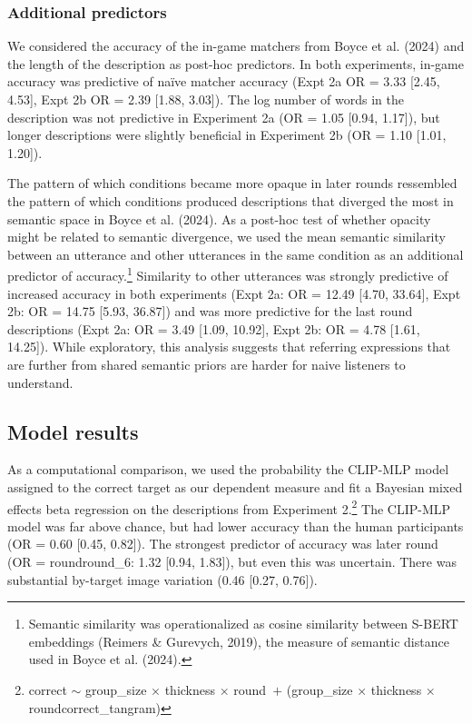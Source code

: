 \documentclass[10pt, letterpaper]{article}
\begin{document}
\subsubsection{Additional predictors}\label{additional-predictors}

We considered the accuracy of the in-game matchers from Boyce et al.
(2024) and the length of the description as post-hoc predictors. In both
experiments, in-game accuracy was predictive of naïve matcher accuracy
(Expt 2a OR = 3.33 {[}2.45, 4.53{]}, Expt 2b OR = 2.39 {[}1.88,
3.03{]}). The log number of words in the description was not predictive
in Experiment 2a (OR = 1.05 {[}0.94, 1.17{]}), but longer descriptions
were slightly beneficial in Experiment 2b (OR = 1.10 {[}1.01, 1.20{]}).

The pattern of which conditions became more opaque in later rounds
ressembled the pattern of which conditions produced descriptions that
diverged the most in semantic space in Boyce et al. (2024). As a
post-hoc test of whether opacity might be related to semantic
divergence, we used the mean semantic similarity between an utterance
and other utterances in the same condition as an additional predictor of
accuracy.\footnote{Semantic similarity was operationalized as cosine
  similarity between S-BERT embeddings (Reimers \& Gurevych, 2019), the
  measure of semantic distance used in Boyce et al. (2024).} Similarity
to other utterances was strongly predictive of increased accuracy in
both experiments (Expt 2a: OR = 12.49 {[}4.70, 33.64{]}, Expt 2b: OR =
14.75 {[}5.93, 36.87{]}) and was more predictive for the last round
descriptions (Expt 2a: OR = 3.49 {[}1.09, 10.92{]}, Expt 2b: OR = 4.78
{[}1.61, 14.25{]}). While exploratory, this analysis suggests that
referring expressions that are further from shared semantic priors are
harder for naive listeners to understand.

\subsection{Model results}\label{model-results}

As a computational comparison, we used the probability the CLIP-MLP
model assigned to the correct target as our dependent measure and fit a
Bayesian mixed effects beta regression on the descriptions from
Experiment 2.\footnote{correct \({\sim}\) group\_size \({\times}\)
  thickness \({\times}\) round~\({+}\) (group\_size \({\times}\)
  thickness \({\times}\) round\textbar correct\_tangram)} The CLIP-MLP
model was far above chance, but had lower accuracy than the human
participants (OR = 0.60 {[}0.45, 0.82{]}). The strongest predictor of
accuracy was later round (OR = roundround\_6: 1.32 {[}0.94, 1.83{]}),
but even this was uncertain. There was substantial by-target image
variation (0.46 {[}0.27, 0.76{]}).
\end{document}
